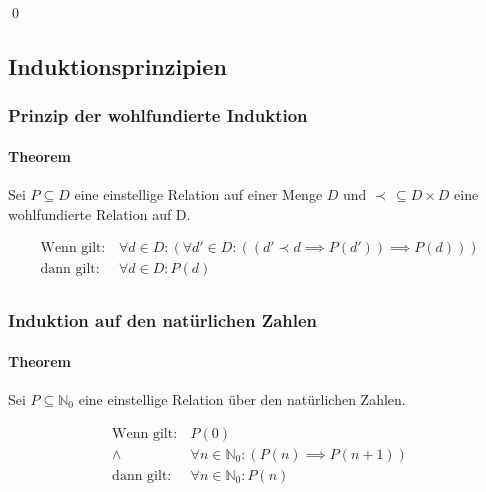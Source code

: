 																	\qed

														\subsection{Induktionsprinzipien}
															\subsubsection{Prinzip der wohlfundierte Induktion}
																\paragraph{Theorem}
																	Sei $ P \subseteq D $ eine einstellige Relation auf einer Menge $ D $ und $ \prec \,\subseteq D \times D $ eine wohlfundierte Relation auf D.

																	\begin{align*}
																		\text{Wenn gilt:} & \,\forall d \in D : (\forall d' \in D : ((d' \prec d \implies P(d')) \implies P(d))) \\
																		\text{dann gilt:} & \,\forall d \in D : P(d)                                                             \\
																	\end{align*}


															\subsubsection{Induktion auf den natürlichen Zahlen}
																\paragraph{Theorem}
																	Sei $ P \subseteq \mathbb{N} _ 0 $ eine einstellige Relation über den natürlichen Zahlen.

																	\begin{align*}
																		\text{Wenn gilt:} & \,P(0)                                                    \\
																		\land             & \,\forall n \in \mathbb{N} _ 0 : (P(n) \implies P(n + 1)) \\
																		\text{dann gilt:} & \,\forall n \in \mathbb{N} _ 0 : P(n)                     \\
																	\end{align*}

